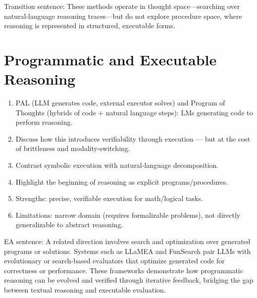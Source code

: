 \documentclass[project]{bsu-cs}  %
\begin{document}
Transition sentence: These methods operate in thought space—searching over natural-language reasoning traces—but do not explore procedure space, where reasoning is represented in structured, executable forms.
% 
%
%
% 
\section{Programmatic and Executable Reasoning}\label{sec:programmatic}
\begin{enumerate}
    \item PAL \citep{gao2023palprogramaidedlanguagemodels} (LLM generates code, external executor solves) and Program of Thoughts \citep{chen2023programthoughtspromptingdisentangling} (hybrids of code + natural language steps): LMs generating code to perform reasoning.

    \item Discuss how this introduces verifiability through execution — but at the cost of brittleness and modality-switching.

    \item Contrast symbolic execution with natural-language decomposition.

    \item Highlight the beginning of reasoning as explicit programs/procedures.

    \item Strengths: precise, verifiable execution for math/logical tasks.

    \item Limitations: narrow domain (requires formalizable problems), not directly generalizable to abstract reasoning.

\end{enumerate}

EA sentence: A related direction involves search and optimization over generated programs or solutions. Systems such as LLaMEA \citep{zhou2024llamea} and FunSearch \citep{rombach2024funsearch} pair LLMs with evolutionary or search-based evaluators that optimize generated code for correctness or performance. These frameworks demonstrate how programmatic reasoning can be evolved and verified through iterative feedback, bridging the gap between textual reasoning and executable evaluation.
% 
%
%
% 
\end{document}
